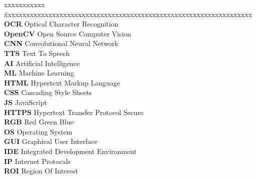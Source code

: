 \abbreviations

\noindent 

\begin{tabbing}
xxxxxxxxxxx \= xxxxxxxxxxxxxxxxxxxxxxxxxxxxxxxxxxxxxxxxxxxxxxxxxxxxxxxxxxxxxxxxxxx \kill
\textbf{OCR}			\> Optical Character Recognition \\
\textbf{OpenCV}		\> Open Source Computer Vision \\
\textbf{CNN}		\> Convolutional Neural Network  \\
\textbf{TTS}		\> Text To Speech \\
\textbf{AI}		\> Artificial Intelligence  \\
\textbf{ML}		\> Machine Learning \\
\textbf{HTML}		\> Hypertext Markup Language \\
\textbf{CSS}		\> Cascading Style Sheets \\
\textbf{JS}		\> JavaScript \\
\textbf{HTTPS}		\> Hypertext Transfer Protocol Secure \\
\textbf{RGB}		\> Red Green Blue\\
\textbf{OS}		\> Operating System \\
\textbf{GUI}		\> Graphical User Interface \\
\textbf{IDE}		\> Integrated Development Environment \\
\textbf{IP}        \> Internet Protocals \\
\textbf{ROI}     \> Region Of Interest \\

\end{tabbing}